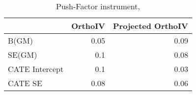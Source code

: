 \begin{table}\centering\caption{Push-Factor instrument, }\begin{tabular}{lrr}
\toprule
                &   OrthoIV &   Projected OrthoIV \\
\midrule
 B(GM)          &      0.05 &                0.09 \\
 SE(GM)         &      0.1  &                0.08 \\
 CATE Intercept &      0.1  &                0.03 \\
 CATE SE        &      0.08 &                0.06 \\
\bottomrule
\end{tabular}\end{table}
